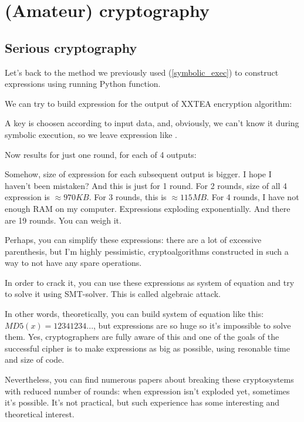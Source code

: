 \section{(Amateur) cryptography}

\subsection{Serious cryptography}

Let's back to the method we previously used (\ref{symbolic_exec}) to construct expressions using running Python function.

We can try to build expression for the output of XXTEA encryption algorithm:



A key is choosen according to input data, and, obviously, we can't know it during symbolic execution, so we leave expression like .

Now results for just one round, for each of 4 outputs:



Somehow, size of expression for each subsequent output is bigger. I hope I haven't been mistaken?
And this is just for 1 round.
For 2 rounds, size of all 4 expression is $\approx 970KB$.
For 3 rounds, this is $\approx 115MB$.
For 4 rounds, I have not enough RAM on my computer.
Expressions exploding exponentially.
And there are 19 rounds.
You can weigh it.

Perhaps, you can simplify these expressions: there are a lot of excessive parenthesis, but I'm highly pessimistic, cryptoalgorithms constructed in such a way to not have any
spare operations.

In order to crack it, you can use these expressions as system of equation and try to solve it using SMT-solver.
This is called algebraic attack.

In other words, theoretically, you can build system of equation like this: $MD5(x)=12341234...$, but expressions are so huge so it's impossible to solve them.
Yes, cryptographers are fully aware of this and one of the goals of the successful cipher is to make expressions as big as possible, using resonable time and size of code.

Nevertheless, you can find numerous papers about breaking these cryptosystems with reduced number of rounds: when expression isn't exploded yet, sometimes it's possible.
It's not practical, but such experience has some interesting and theoretical interest.

